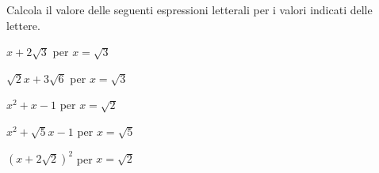 % 
% 

\begin{esercizio}%
Calcola il valore delle seguenti espressioni letterali per i valori indicati 
delle lettere.
\begin{multicols}{3}
\begin{enumeratea}
\item \(x+2\sqrt 3\) per \(x=\sqrt 3\)
\item \(\sqrt 2x+3\sqrt 6\) per \(x=\sqrt{3}\)
\item \(x^2+x-1\) per \(x=\sqrt 2\)
\item \(x^2+\sqrt 5x-1\) per \(x=\sqrt 5\)
\item \((x+2\sqrt 2)^2\) per \(x=\sqrt 2\)
\end{enumeratea}
\end{multicols}
\end{esercizio}

